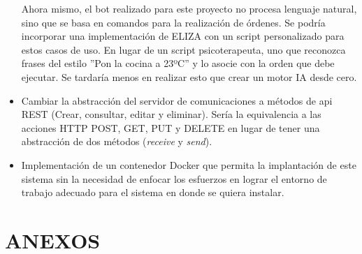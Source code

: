 \documentclass[spanish,12pt, a4paper, twoside]{paper}
\let\oldsection\section
\def\section{\cleardoublepage\oldsection}
\begin{document}
\begin{itemize}
Ahora mismo, el bot realizado para este proyecto no procesa lenguaje natural, sino que se basa en comandos para la realización de órdenes. Se podría incorporar una implementación de ELIZA con un script personalizado para estos casos de uso. En lugar de un script psicoterapeuta, uno que reconozca frases del estilo ''Pon la cocina a 23ºC'' y lo asocie con la orden que debe ejecutar. Se tardaría menos en realizar esto que crear un motor IA desde cero.

\item Cambiar la abstracción del servidor de comunicaciones a métodos de api REST (Crear, consultar, editar y eliminar). Sería la equivalencia a las acciones HTTP POST, GET, PUT y DELETE en lugar de tener una abstracción de dos métodos (\emph{receive} y \emph{send}).

\item Implementación de un contenedor Docker que permita la implantación de este sistema sin la necesidad de enfocar los esfuerzos en lograr el entorno de trabajo adecuado para el sistema en donde se quiera instalar.
\end{itemize}

\section*{ANEXOS}


\newpage
\end{document}
